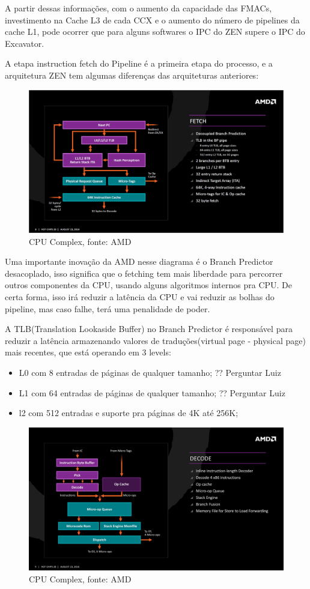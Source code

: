 \documentclass[12pt]{article}
\begin{document}
A partir dessas informações, com o aumento da capacidade das FMACs, investimento na Cache L3 de cada CCX e o aumento do número de pipelines da cache L1, pode ocorrer que para alguns softwares o IPC do ZEN supere o IPC do Excavator.

A etapa instruction fetch do Pipeline é a primeira etapa do processo, e a arquitetura ZEN tem algumas diferenças das arquiteturas anteriores:

\begin{figure}[H]
\centering
\includegraphics[width=115mm,scale=0.8]{AMD-Zen_Fetch.png}
\caption{CPU Complex, fonte: AMD}
\label{fig:AMD CORE}
\end{figure}

Uma importante inovação da AMD nesse diagrama é o Branch Predictor desacoplado, isso significa que o fetching tem mais liberdade para percorrer outros componentes da CPU, usando alguns algoritmos internos pra CPU. De certa forma, isso irá reduzir a latência da CPU e vai reduzir as bolhas do pipeline, mas caso falhe, terá uma penalidade de poder.

A TLB(Translation Lookaside Buffer) no Branch Predictor é responsável para reduzir a latência armazenando valores de traduções(virtual page - physical page) mais recentes, que está operando em 3 levels:

\begin{itemize}
	\item L0 com 8 entradas de páginas de qualquer tamanho; ?? Perguntar Luiz
	\item L1 com 64 entradas de páginas de qualquer tamanho; ?? Perguntar Luiz
	\item l2 com 512 entradas e suporte pra páginas de 4K até 256K;
\end{itemize}

\begin{figure}[H]
\centering
\includegraphics[width=115mm,scale=0.5]{amd-zen-decode.jpg}
\caption{CPU Complex, fonte: AMD}
\label{fig:AMD CORE}
\end{figure}
\end{document}
